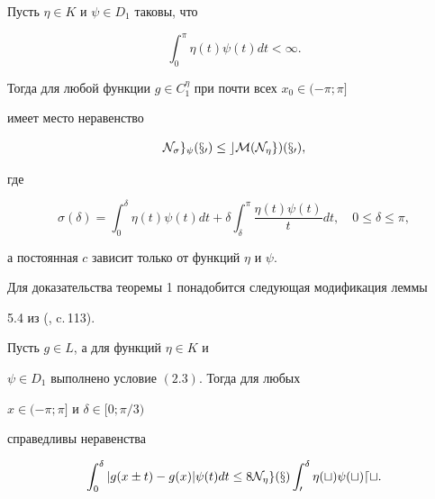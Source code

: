 \begin{thm}


Пусть $\eta\in K$ и $\psi\in D_1$ таковы, что


\begin{equation}


\int_0^\pi\eta(t)\psi(t)dt<\infty.


\end{equation}


Тогда для любой функции $g\in C_1^\eta$ при почти всех $x_0\in(-\pi;\pi]$


имеет место неравенство


\begin{equation}


\N_\sigma g_\psi(x_0)\le cM(\N_\eta g)(x_0),


\end{equation}


где


\begin{equation}


\sigma(\delta)=\int_0^\delta\eta(t)\psi(t)dt+\delta


\int_\delta^\pi\frac{\eta(t)\psi(t)}{t}dt,\quad 0\le\delta\le\pi,


\end{equation}


а постоянная $c$ зависит только от функций $\eta$ и $\psi$.


\end{thm}





Для доказательства теоремы 1 понадобится следующая модификация леммы


5.4 из (\cite{kor}, c.\,113).





\begin{lem}


Пусть $g\in L$, а для функций $\eta\in K$ и


$\psi\in D_1$ выполнено условие $(2.3)$. Тогда для любых


$x\in(-\pi;\pi]$ и $\delta\in[0;\pi/3)$


справедливы неравенства


$$


\int^\delta_0|g(x\pm t)-g(x)|\psi(t)dt\le 8\N_\eta g(x)


\int^\delta_0\eta(t)\psi(t)dt.


$$


\end{lem}





